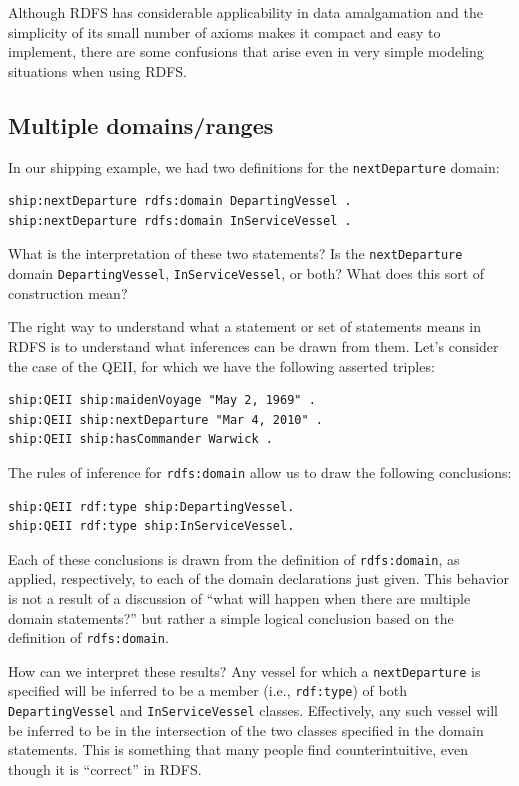Although RDFS has considerable applicability in data amalgamation and
the simplicity of its small number of axioms makes it compact and easy
to implement, there are some confusions that arise even in very simple
modeling situations when using RDFS.

\subsection{Multiple domains/ranges}
\label{multidomain}
In our shipping example, we had two definitions for the \texttt{nextDeparture}
domain:

\begin{lstlisting}
ship:nextDeparture rdfs:domain DepartingVessel .
ship:nextDeparture rdfs:domain InServiceVessel .
\end{lstlisting}

What is the interpretation of these two statements? Is the \texttt{nextDeparture}
domain \texttt{DepartingVessel}, \texttt{InServiceVessel}, or both? What does this sort of
construction mean?

The right way to understand what a statement or set of statements means
in RDFS is to understand what inferences can be drawn from them. Let's
consider the case of the QEII, for which we have the following asserted
triples:

\begin{lstlisting}
ship:QEII ship:maidenVoyage "May 2, 1969" .
ship:QEII ship:nextDeparture "Mar 4, 2010" .
ship:QEII ship:hasCommander Warwick .
\end{lstlisting}

The rules of inference for \texttt{rdfs:domain} allow us to draw the following
conclusions:

\begin{lstlisting}
ship:QEII rdf:type ship:DepartingVessel.
ship:QEII rdf:type ship:InServiceVessel.
\end{lstlisting}

Each of these conclusions is drawn from the definition of \texttt{rdfs:domain},
as applied, respectively, to each of the domain declarations just given.
This behavior is not a result of a discussion of ``what will happen when
there are multiple domain statements?'' but rather a simple logical
conclusion based on the definition of \texttt{rdfs:domain}.

How can we interpret these results? Any vessel for which a \texttt{nextDeparture}
is specified will be
inferred to be a member (i.e., \texttt{rdf:type}) of both \texttt{DepartingVessel} and
\texttt{InServiceVessel} classes. Effectively, any such vessel will be inferred
to be in the intersection of the two classes specified in the domain
statements. This is something that many people find counterintuitive,
even though it is ``correct'' in RDFS.

